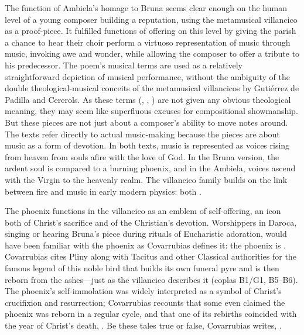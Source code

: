 The function of Ambiela's homage to Bruna seems clear enough on the human level
of a young composer building a reputation, using the metamusical villancico as
a proof-piece.
It fulfilled functions of offering on this level by giving the parish a chance
to hear their choir perform a virtuoso representation of music through music,
invoking awe and wonder, while allowing the composer to offer a tribute to his
predecessor.
The poem's musical terms are used as a relatively straightforward depiction of
musical performance, without the ambiguity of the double theological-musical
conceits of the metamusical villancicos by Gutiérrez de Padilla and Cererols.
As these terms (, , ) are
not given any obvious theological meaning, they may seem like superfluous
excuses for compositional showmanship.
But these pieces are not just about a composer's ability to move notes around.
The texts refer directly to actual music-making because the pieces are about
music as a form of devotion.
In both texts, music is represented as voices rising from heaven from souls
afire with the love of God.
In the Bruna version, the ardent soul is compared to a burning phoenix, and in
the Ambiela, voices ascend with the Virgin to the heavenly realm.
The villancico family builds on the link between fire and music in early modern
physics: both .


The phoenix functions in the villancico as an emblem of self-offering, an icon
both of Christ's sacrifice and of the Christian's devotion.
Worshippers in Daroca, singing or hearing Bruna's piece during rituals of
Eucharistic adoration, would have been familiar with the phoenix as Covarrubias
defines it: the phoenix is .%
    \Autocite[400, ]{Covarrubias:Tesoro}
Covarrubias cites Pliny along with Tacitus and other Classical authorities for
the famous legend of this noble bird that builds its own funeral pyre and is
then reborn from the ashes---just as the villancico describes it (coplas B1/G1,
B5--B6).
The phoenix's self-immolation was widely interpreted as a symbol of Christ's
crucifixion and resurrection; Covarrubias recounts that some even claimed the
phoenix was reborn in a regular cycle, and that one of its rebirths coincided
with the year of Christ's death, .
Be these tales true or false, Covarrubias writes, .%
    \Autocite[400, ]{Covarrubias:Tesoro}

